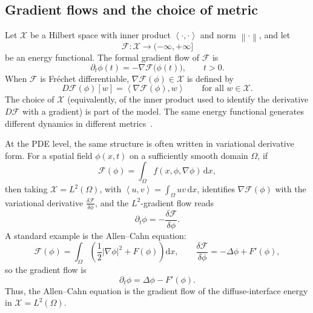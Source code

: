\documentclass[11pt,letterpaper]{article}
\theoremstyle{plain}
\theoremstyle{definition}
\newcommand{\grad}{\nabla}%
\newcommand{\norm}[1]{\left\| #1 \right\|}
\newcommand{\E}{\mathcal{F}}
\newcommand{\X}{\mathcal{X}}
\newcommand{\dd}{\mathrm{d}}
\newcommand{\ip}[2]{\left\langle #1,#2\right\rangle}
\begin{document}
\subsection{Gradient flows and the choice of metric} Let \(\X\) be a Hilbert space with inner product \(\ip{\cdot}{\cdot}\) and norm \(\norm{\cdot}\), and let
\[
\E : \X \to (-\infty,+\infty]
\]
be an energy functional. The formal gradient flow of \(\E\) is
\begin{equation}
\partial_t \phi(t) = -\grad \E\bigl(\phi(t)\bigr),
\qquad t>0.
\label{eq:abstract-gf}
\end{equation}
When \(\E\) is Fr\'echet differentiable, \(\grad \E(\phi)\in \X\) is defined by
\[
D\E(\phi)[w] = \ip{\grad \E(\phi)}{w}
\qquad \text{for all } w\in \X.
\]
The choice of \(\X\) (equivalently, of the inner product used to identify the derivative \(D\E\) with a gradient) is part of the model. The same energy functional generates different dynamics in different metrics~\cite{Ambrosio2008}.

At the PDE level, the same structure is often written in variational derivative form. For a spatial field \(\phi(x,t)\) on a sufficiently smooth domain \(\Omega\), if
\[
\E(\phi)=\int_\Omega f(x,\phi,\grad \phi)\,\dd x,
\]
then taking \(\X=L^2(\Omega)\), with \(\ip{u}{v}=\int_\Omega uv\,\dd x\), identifies \(\grad\E(\phi)\) with the variational derivative \(\frac{\delta\E}{\delta\phi}\), and the \(L^2\)-gradient flow reads
\begin{equation}
\partial_t \phi = -\frac{\delta \E}{\delta \phi}.
\end{equation}
A standard example is the Allen--Cahn equation:
\[
\E(\phi)=\int_\Omega \left(\frac12 |\grad \phi|^2 + F(\phi)\right)\dd x,
\qquad
\frac{\delta \E}{\delta \phi} = -\Delta \phi + F'(\phi),
\]
so the gradient flow is
\[
\partial_t \phi = \Delta \phi - F'(\phi).
\]
Thus, the Allen--Cahn equation is the gradient flow of the diffuse-interface energy in \(\X=L^2(\Omega)\).
\end{document}
